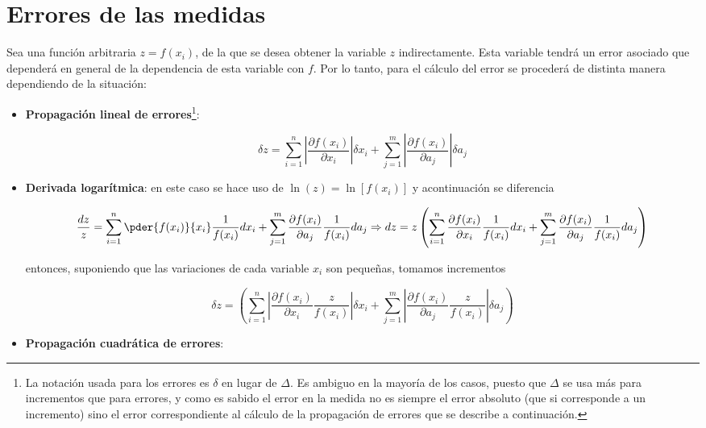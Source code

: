 \section{Errores de las medidas}

Sea una función arbitraria $z=f(x_i)$, de la que se desea obtener
la variable $z$ indirectamente. Esta variable tendrá un error asociado que dependerá en general de la dependencia de esta variable con $f$. Por lo tanto, para el cálculo del error se procederá de distinta manera dependiendo de la situación:

\begin{itemize}
 \item \textbf{Propagación lineal de errores}\footnote{ La notación usada para los errores es $\delta$ en lugar de $\Delta$. Es ambiguo en la mayoría de los casos, puesto que $\Delta$ se usa más para incrementos que para errores, y como es sabido el error en la medida no es siempre el error absoluto (que si corresponde a un incremento) sino el error correspondiente al cálculo de la propagación de errores que se describe a continuación.}:  

\begin{equation}
  \delta z = \sum_{i=1}^{n} \left| \frac{\partial f(x_i)}{\partial x_i}\right|\delta x_i + 
             \sum_{j=1}^{m} \left| \frac{\partial f(x_i)}{\partial a_j}\right|\delta a_j
  \label{eq:l-err}
\end{equation}

\item \textbf{Derivada logarítmica}: en este caso se hace uso de $\ln(z) = \ln[f(x_i)]$ y acontinuación se diferencia

$$
\frac{dz}{z} = \sum_{i=1}^{n}\pder{f(x_i)}{x_i} \frac{1}{f(x_i)} dx_i + \sum_{j=1}^{m}\frac{\partial
f(x_i)}{\partial a_j} \frac{1}{f(x_i)} da_j \Rightarrow dz =  
z \left( 
\sum_{i=1}^{n}\frac{\partial f(x_i)}{\partial x_i}\frac{1}{f(x_i)} dx_i + 
\sum_{j=1}^{m}\frac{\partial f(x_i)}{\partial a_j} \frac{1}{f(x_i)} da_j
\right)
$$

entonces, suponiendo que las variaciones de cada variable $x_i$ son pequeñas, tomamos incrementos

$$
\delta z = 
 \left(  \sum_{i=1}^n \left| \frac{\partial f(x_i)}{\partial x_i} \frac{z}{f(x_i)} \right| \delta x_i  + 
         \sum_{j=1}^{m} \left| \frac{\partial f(x_i)}{\partial a_j} \frac{z}{f(x_i)} \right| \delta a_j\right)
 \label{eq:ln-err}
$$

\item \textbf{Propagación cuadrática de errores}:


\end{itemize}

